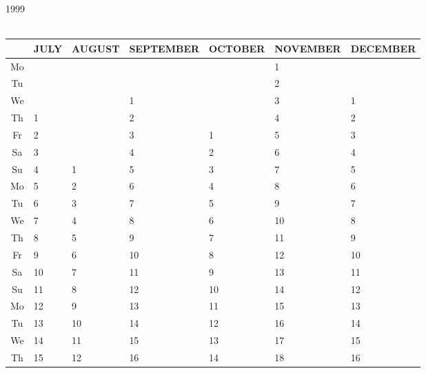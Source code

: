 \documentclass[a4paper]{article}
\newcommand{\monthstrut}{\rule{0pt}{12pt}}
\newcommand{\datestrut}{\rule{0pt}{12pt}}
\begin{document}
\thispagestyle{empty}
\begin{table}
\hspace{1cm} {\LARGE 1999}\\
{\ }  \\
\begin{tabular}{|c||p{2.5cm}|p{2.5cm}|p{2.5cm}|p{2.5cm}|p{2.5cm}|p{2.5cm}|}
\hline
   \multicolumn{1}{|c||}{\monthstrut\ } &
   \multicolumn{1}{|c|}{JULY} &
   \multicolumn{1}{|c|}{AUGUST} &
   \multicolumn{1}{|c|}{SEPTEMBER} &
   \multicolumn{1}{|c|}{OCTOBER} &
   \multicolumn{1}{|c|}{NOVEMBER} &
   \multicolumn{1}{|c|}{DECEMBER} \\
   \hline
   \hline
\datestrut Mo &     &    &     &   &  1  &     \\
\cline{1-1}\cline{6-6}
\datestrut Tu &     &    &     &   &  2  &     \\
\cline{1-1}\cline{4-4}\cline{6-7}
\datestrut We &     &    & 1   &   &  3  & 1    \\
\cline{1-2}\cline{4-4}\cline{6-7}
\datestrut Th & 1   &    & 2   &   &  4  & 2    \\
\cline{1-2}\cline{4-7}
\datestrut Fr & 2   &    & 3   & 1 &  5  & 3    \\
\cline{1-2}\cline{4-7}
\datestrut Sa & 3   &    & 4   & 2 &  6  & 4    \\
\hline
\datestrut Su & 4   & 1  & 5   & 3 &  7  & 5    \\
\hline\hline
\datestrut Mo & 5   & 2  & 6   & 4 &  8  & 6    \\
\hline
\datestrut Tu & 6   & 3  & 7   & 5 &  9  & 7    \\
\hline
\datestrut We & 7   & 4  & 8   & 6 &  10 & 8    \\
\hline
\datestrut Th & 8   & 5  & 9   & 7 &  11 & 9    \\
\hline
\datestrut Fr & 9   & 6  & 10  & 8 &  12 & 10   \\
\hline
\datestrut Sa & 10  & 7  & 11  & 9 &  13 & 11   \\
\hline
\datestrut Su & 11  & 8  & 12  & 10&  14 & 12   \\
\hline\hline
\datestrut Mo & 12  & 9  & 13  & 11&  15 & 13   \\
\hline
\datestrut Tu & 13  & 10 & 14  & 12&  16 & 14   \\
\hline
\datestrut We & 14  & 11 & 15  & 13&  17 & 15   \\
\hline
\datestrut Th & 15  & 12 & 16  & 14&  18 & 16   \\

\end{tabular}
\end{table}
\end{document}
